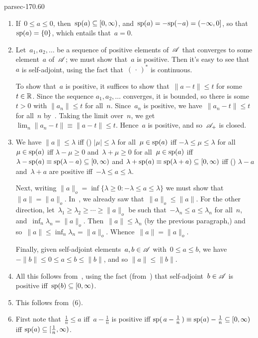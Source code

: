 \documentclass[b5page]{book}
\begin{document}
\begin{solution}{parsec-170.60}
\begin{enumerate}
\item
If~$0\leq a\leq 0$,
then~$\mathrm{sp}(a)\subseteq [0,\infty)$,
and~$\mathrm{sp}(a)=-\mathrm{sp}(-a)= (-\infty,0]$,
so that~$\mathrm{sp}(a)=\{0\}$,
which entails that~$a=0$.
\item
Let~$a_1,a_2,\dotsc$ be a sequence of positive elements
of~$\mathscr{A}$ that converges to some element~$a$ of~$\mathscr{A}$;
we must show that~$a$ is positive.
Then it's easy to see that~$a$ is self-adjoint,
using the fact that~$(\,\cdot\,)^*$ is continuous.

To show that~$a$ is positive,
it suffices to show that~$\|a-t\|\leq t$ for some~$t\in \mathbb{R}$.
Since the sequence $a_1,a_2,\dotsc$  converges,
it is bounded,
so there is some~$t>0$ with $\|a_n\|\leq t$ for all~$n$.
Since~$a_n$ is positive,
we have~$\|a_n-t\|\leq t$ for all~$n$
by~.
Taking the limit over~$n$,
we get $\lim_n\|a_n-t\|\equiv \|a-t\|\leq t$.
Hence~$a$ is positive, and so~$\mathscr{A}_+$ is closed.

\item
We have
$\|a\|\leq \lambda$
iff () $\left|\mu\right|\leq \lambda$
for all~$\mu\in\mathrm{sp}(a)$
iff $-\lambda \leq \mu \leq \lambda$
for all~$\mu\in\mathrm{sp}(a)$
iff
$\lambda-\mu\geq 0$ and~$\lambda+\mu\geq 0$
for all~$\mu\in\mathrm{sp}(a)$
iff
$\lambda-\mathrm{sp}(a)\equiv\mathrm{sp}(\lambda-a)\subseteq [0,\infty)$
and $\lambda+\mathrm{sp}(a)\equiv\mathrm{sp}(\lambda+a)\subseteq [0,\infty)$
iff ()
$\lambda -a$ and~$\lambda+a$ are positive
iff~$-\lambda \leq a\leq \lambda$.

Next,
writing $\|a\|_o = \inf\{\lambda\geq 0\colon -\lambda\leq a \leq \lambda\}$
we must show that~$\|a\|=\|a\|_o$.
In~,
we already saw that~$\|a\|_o\leq \|a\|$.
For the other direction,
let~$\lambda_1\geq \lambda_2\geq\dotsb\geq \|a\|_o$
be such that~$-\lambda_n \leq a\leq \lambda_n$
for all~$n$,
and~$\inf_n \lambda_n = \|a\|_o$.
Then~$\|a\|\leq \lambda_n$
(by the previous paragraph,)
and so~$\|a\|\leq \inf_n\lambda_n = \|a\|_o$.
Whence~$\|a\|=\|a\|_o$.

Finally,
given self-adjoint elements~$a,b\in\mathscr{A}$ with~$0\leq a\leq b$,
we have~$-\|b\|\leq 0\leq a \leq b\leq \|b\|$,
and so $\|a\|\leq\|b\|$.
\item
All this follows from~,
using the fact (from~) that self-adjoint~$b\in\mathscr{A}$
is positive iff~$\mathrm{sp}(b)\subseteq[0,\infty)$.
\item
This follows from~(6).
\item
First note that~$\frac{1}{n}\leq a$
iff~$a-\frac{1}{n}$ is positive
iff $\mathrm{sp}(\,a-\frac{1}{n}\,)\equiv \mathrm{sp}(a)-\frac{1}{n} \subseteq [0,\infty)$
iff $\mathrm{sp}(a)\subseteq [\frac{1}{n},\infty)$.


\end{enumerate}
\end{solution}
\end{document}
